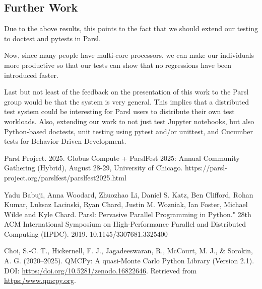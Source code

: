 \subsection{Further Work}

Due to the above results, this points to the fact that we should extend our testing to doctest and pytests in Parsl.

Now, since many people have multi-core processors, we can make our individuals more productive so that our tests can show that no regressions have been introduced faster.

Last but not least of the feedback on the presentation of this work to the Parsl group would be that the system is very general. This implies that a distributed test system could be interesting for Parsl users to distribute their own test workloads. 
Also, extending our work to not just test Jupyter notebooks, but also Python-based doctests, unit testing using pytest and/or unittest, and Cucumber tests for Behavior-Driven Development.


\begin{thebibliography}{6}

Parsl Project. 2025. Globus Compute + ParslFest 2025: Annual Community Gathering (Hybrid), August 28-29, University of Chicago. https://parsl-project.org/parslfest/parslfest2025.html

Yadu Babuji, Anna Woodard, Zhuozhao Li, Daniel S. Katz, Ben Clifford, Rohan Kumar, Luksaz Lacinski, Ryan Chard, Justin M. Wozniak, Ian Foster, Michael Wilde and Kyle Chard. Parsl: Pervasive Parallel Programming in Python." 28th ACM International Symposium on High-Performance Parallel and Distributed Computing (HPDC). 2019. 10.1145/3307681.3325400

Choi, S.-C. T., Hickernell, F. J., Jagadeeswaran, R., McCourt, M. J., \& Sorokin, A. G. (2020--2025).
QMCPy: A quasi-Monte Carlo Python Library (Version 2.1).
DOI: \url{https:/doi.org/10.5281/zenodo.16822646}. 
Retrieved from \url{https:/www.qmcpy.org}.



\end{thebibliography}
